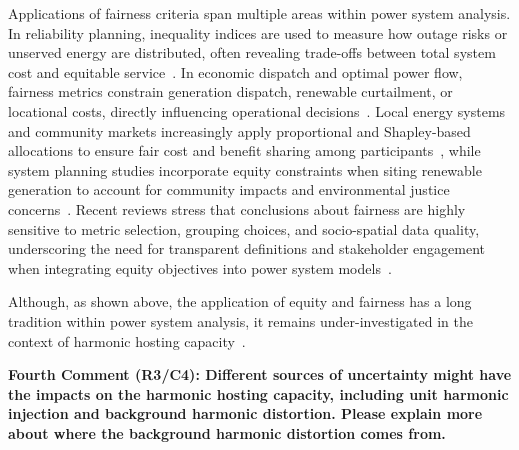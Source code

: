 \documentclass[10pt]{article}
\begin{document}
\begin{tcolorbox}[colback=black!5!white,colframe=black]
Applications of fairness criteria span multiple areas within power system analysis. In reliability planning, inequality indices are used to measure how outage risks or unserved energy are distributed, often revealing trade-offs between total system cost and equitable service~\cite{heylen_fairness_2019}. In economic dispatch and optimal power flow, fairness metrics constrain generation dispatch, renewable curtailment, or locational costs, directly influencing operational decisions~\cite{sun_gini_2020}. Local energy systems and community markets increasingly apply proportional and Shapley-based allocations to ensure fair cost and benefit sharing among participants~\cite{obrien_shapley_2015}, while system planning studies incorporate equity constraints when siting renewable generation to account for community impacts and environmental justice concerns~\cite{lohr_integration_2024}. Recent reviews stress that conclusions about fairness are highly sensitive to metric selection, grouping choices, and socio-spatial data quality, underscoring the need for transparent definitions and stakeholder engagement when integrating equity objectives into power system models~\cite{goforth_incorporating_2025}. \newline

Although, as shown above, the application of equity and fairness has a long tradition within power system analysis, it remains under-investigated in the context of harmonic hosting capacity~\cite{santos_considerations_2015}.

\end{tcolorbox}

\textbf{Fourth Comment (R3/C4): Different sources of uncertainty might have the impacts on the harmonic hosting capacity, including unit harmonic injection and background harmonic distortion. Please explain more about where the background harmonic distortion comes from.}
\end{document}
